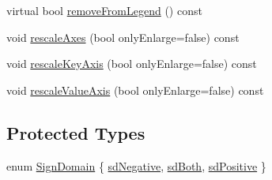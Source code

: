 \begin{DoxyCompactItemize}
\item 
virtual bool \hyperlink{class_q_c_p_abstract_plottable_aa1f350e510326d012b9a9c9249736c83}{remove\+From\+Legend} () const 
\item 
void \hyperlink{class_q_c_p_abstract_plottable_a7e8fc3be43c27ccacd70a7bf9d74a5cd}{rescale\+Axes} (bool only\+Enlarge=false) const 
\item 
void \hyperlink{class_q_c_p_abstract_plottable_a1acecfcca3e7fcda00fcbaa3c886386f}{rescale\+Key\+Axis} (bool only\+Enlarge=false) const 
\item 
void \hyperlink{class_q_c_p_abstract_plottable_abfd0805eb1d955c0111a990246658324}{rescale\+Value\+Axis} (bool only\+Enlarge=false) const 
\end{DoxyCompactItemize}
\subsection*{Protected Types}
\begin{DoxyCompactItemize}
\item 
enum \hyperlink{class_q_c_p_abstract_plottable_a661743478a1d3c09d28ec2711d7653d8}{Sign\+Domain} \{ \hyperlink{class_q_c_p_abstract_plottable_a661743478a1d3c09d28ec2711d7653d8a0fc9a70796ef60ad18ddd18056e6dc63}{sd\+Negative}, 
\hyperlink{class_q_c_p_abstract_plottable_a661743478a1d3c09d28ec2711d7653d8a082b98cfb91a7363a3b5cd17b0c1cd60}{sd\+Both}, 
\hyperlink{class_q_c_p_abstract_plottable_a661743478a1d3c09d28ec2711d7653d8a02951859f243a4d24e779cfbb5471030}{sd\+Positive}
 \}
\end{DoxyCompactItemize}
